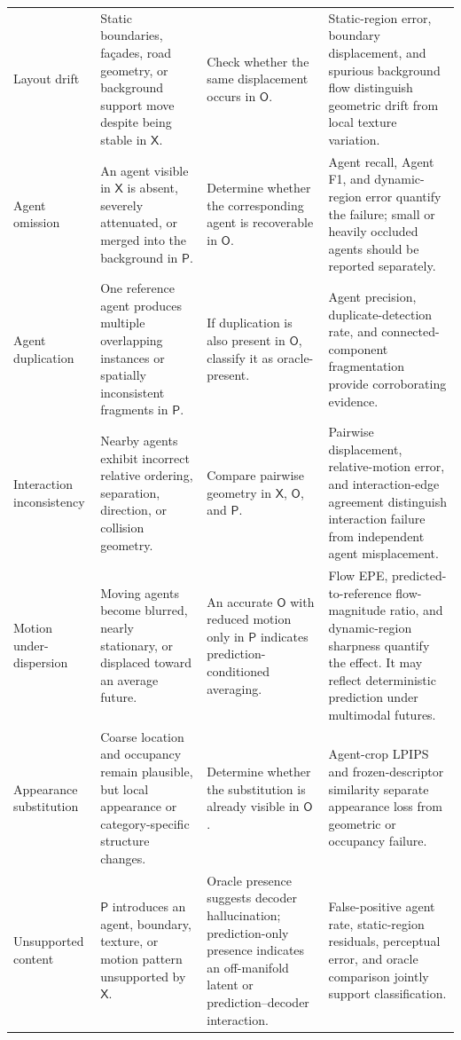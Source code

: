 \begin{table}[ht!]
\begin{tabularx}{\textwidth}{
    p{}
    p{}
    p{}
    >{\raggedright\arraybackslash}X
}
Layout drift
&
Static boundaries, façades, road geometry, or background support move
despite being stable in \(\mathsf{X}\).
&
Check whether the same displacement occurs in \(\mathsf{O}\).
&
Static-region error, boundary displacement, and spurious background
flow distinguish geometric drift from local texture variation.
\\

Agent omission
&
An agent visible in \(\mathsf{X}\) is absent, severely attenuated, or
merged into the background in \(\mathsf{P}\).
&
Determine whether the corresponding agent is recoverable in
\(\mathsf{O}\).
&
Agent recall, Agent F1, and dynamic-region error quantify the failure;
small or heavily occluded agents should be reported separately.
\\

Agent duplication
&
One reference agent produces multiple overlapping instances or
spatially inconsistent fragments in \(\mathsf{P}\).
&
If duplication is also present in \(\mathsf{O}\), classify it as
oracle-present.
&
Agent precision, duplicate-detection rate, and connected-component
fragmentation provide corroborating evidence.
\\

Interaction inconsistency
&
Nearby agents exhibit incorrect relative ordering, separation,
direction, or collision geometry.
&
Compare pairwise geometry in
\(\mathsf{X}\), \(\mathsf{O}\), and \(\mathsf{P}\).
&
Pairwise displacement, relative-motion error, and interaction-edge
agreement distinguish interaction failure from independent agent
misplacement.
\\

Motion under-dispersion
&
Moving agents become blurred, nearly stationary, or displaced toward
an average future.
&
An accurate \(\mathsf{O}\) with reduced motion only in
\(\mathsf{P}\) indicates prediction-conditioned averaging.
&
Flow EPE, predicted-to-reference flow-magnitude ratio, and
dynamic-region sharpness quantify the effect. It may reflect
deterministic prediction under multimodal futures.
\\

Appearance substitution
&
Coarse location and occupancy remain plausible, but local appearance
or category-specific structure changes.
&
Determine whether the substitution is already visible in
\(\mathsf{O}\).
&
Agent-crop LPIPS and frozen-descriptor similarity separate appearance
loss from geometric or occupancy failure.
\\

Unsupported content
&
\(\mathsf{P}\) introduces an agent, boundary, texture, or motion pattern
unsupported by \(\mathsf{X}\).
&
Oracle presence suggests decoder hallucination; prediction-only
presence indicates an off-manifold latent or prediction--decoder
interaction.
&
False-positive agent rate, static-region residuals, perceptual error,
and oracle comparison jointly support classification.
\\

\bottomrule
\end{tabularx}
\end{table}



